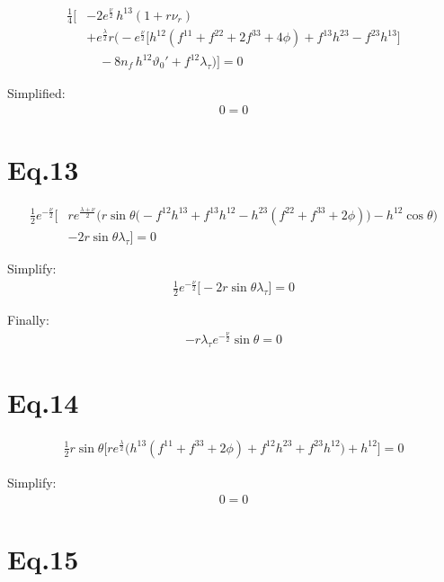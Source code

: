 \documentclass[12pt]{article}
\begin{document}
\begin{align*}
\frac{1}{4} \Big[
 & -2 e^{\frac{\nu}{2}} \, h^{13} \left( 1 + r \nu_r \right) \\
 & + e^{\frac{\lambda}{2}} r \Big(
   - e^{\frac{\nu}{2}} \big[
       h^{12}(f^{11} + f^{22} + 2f^{33} + 4\phi)
       + f^{13} h^{23}
       - f^{23} h^{13}
     \big] \\
   & \quad - 8 n_f \, h^{12} \vartheta_0'
   + f^{12}\lambda_\tau
 \Big)
\Big] = 0
\end{align*}

Simplified:
\begin{align*}
  0 = 0
\end{align*}

\section*{Eq.13}

\begin{align*}
\frac{1}{2} e^{-\frac{\nu}{2}} \Big[
  & r e^{\frac{\lambda + \nu}{2}} 
  \Big(
    r \sin\theta \big(
      -f^{12}h^{13}
      + f^{13}h^{12}
      - h^{23}(f^{22} + f^{33} + 2\phi)
    \big)
    - h^{12}\cos\theta
  \Big) \\
  & - 2r \sin\theta \lambda_\tau
\Big] = 0
\end{align*}

Simplify:
\begin{align*}
\frac{1}{2} e^{-\frac{\nu}{2}} \Big[ - 2r \sin\theta \lambda_\tau \Big] = 0
\end{align*}

Finally:
\begin{align*}
- r \lambda_\tau e^{-\frac{\nu}{2}}\sin\theta = 0
\end{align*}

\section*{Eq.14}

\begin{align*}
\frac{1}{2} r \sin\theta \Big[
  r e^{\frac{\lambda}{2}}
  \big(
    h^{13}(f^{11} + f^{33} + 2\phi)
    + f^{12}h^{23}
    + f^{23}h^{12}
  \big)
  + h^{12}
\Big] = 0
\end{align*}

Simplify:
\begin{align*}
  0 = 0
\end{align*}

\section*{Eq.15}
\end{document}
